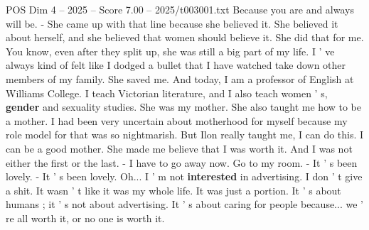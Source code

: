 \begin{textsample}{POS Dim 4 – 2025 – Score 7.00 – 2025/t003001.txt}
Because you are and always will be. - She came up with that line because she believed it.
She believed it about herself, and she believed that women should believe it.
She did that for me.
You know, even after they split up, she was still a big part of my life.
I ' ve always kind of felt like I dodged a bullet that I have watched take down other members of my family.
She saved me.
And today, I am a professor of English at Williams College.
I teach Victorian literature, and I also teach women ' s, \textbf{gender} and sexuality studies.
She was my mother.
She also taught me how to be a mother.
I had been very uncertain about motherhood for myself because my role model for that was so nightmarish.
But Ilon really taught me, I can do this.
I can be a good mother.
She made me believe that I was worth it.
And I was not either the first or the last. - I have to go away now.
Go to my room. - It ' s been lovely. - It ' s been lovely.
Oh...
I ' m not \textbf{interested} in advertising.
I don ' t give a shit.
It wasn ' t like it was my whole life.
It was just a portion.
It ' s about humans ; it ' s not about advertising.
It ' s about caring for people because... we ' re all worth it, or no one is worth it.

\end{textsample}

